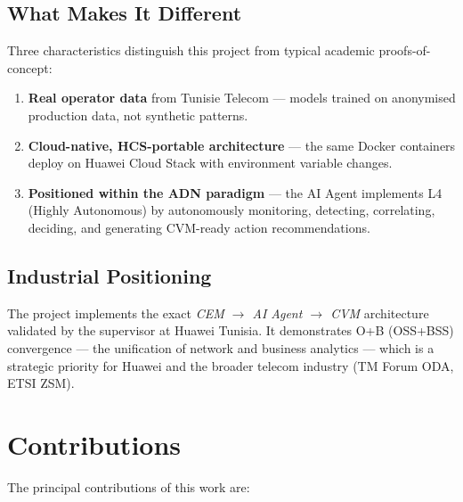 \subsection{What Makes It Different}

Three characteristics distinguish this project from typical academic proofs-of-concept:

\begin{enumerate}
  \item \textbf{Real operator data} from Tunisie Telecom --- models trained on anonymised production data, not synthetic patterns.
  
  \item \textbf{Cloud-native, HCS-portable architecture} --- the same Docker containers deploy on Huawei Cloud Stack with environment variable changes.
  
  \item \textbf{Positioned within the ADN paradigm} --- the AI Agent implements L4 (Highly Autonomous) by autonomously monitoring, detecting, correlating, deciding, and generating CVM-ready action recommendations.
\end{enumerate}

\subsection{Industrial Positioning}

The project implements the exact \textit{CEM $\to$ AI Agent $\to$ CVM} architecture validated by the supervisor at Huawei Tunisia. It demonstrates O+B (OSS+BSS) convergence --- the unification of network and business analytics --- which is a strategic priority for Huawei and the broader telecom industry (TM Forum ODA, ETSI ZSM).

\section{Contributions}

The principal contributions of this work are:

